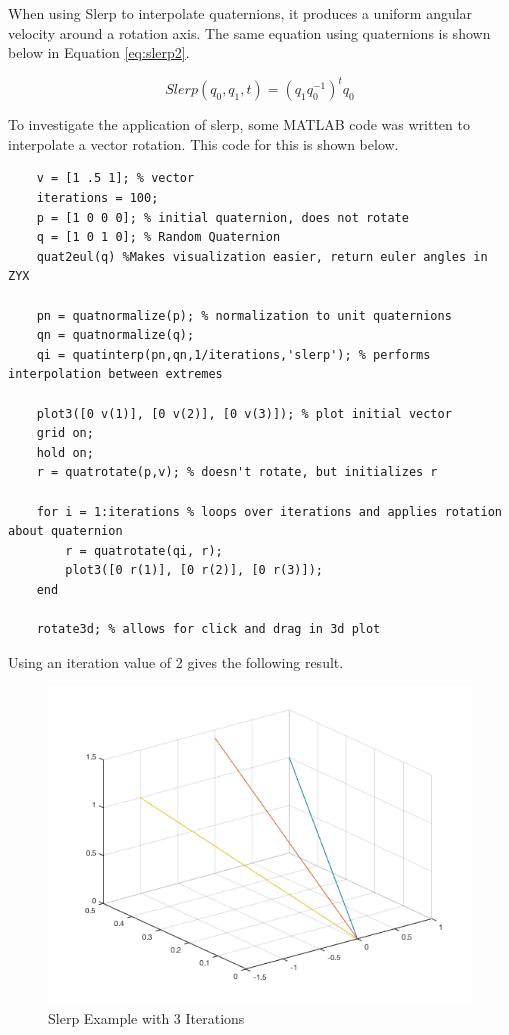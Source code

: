 When using Slerp to interpolate quaternions, it produces a uniform angular velocity around a rotation axis.
The same equation using quaternions is shown below in Equation \ref{eq:slerp2}.

\begin{equation}
	Slerp(q_0, q_1, t) = (q_1q_0^{-1})^tq_0
\label{eq:slerp2}
\end{equation}

To investigate the application of slerp, some MATLAB code was written to interpolate a vector rotation.
This code for this is shown below.

\begin{verbatim}
	v = [1 .5 1]; % vector
	iterations = 100;
	p = [1 0 0 0]; % initial quaternion, does not rotate
	q = [1 0 1 0]; % Random Quaternion
	quat2eul(q) %Makes visualization easier, return euler angles in ZYX

	pn = quatnormalize(p); % normalization to unit quaternions
	qn = quatnormalize(q);
	qi = quatinterp(pn,qn,1/iterations,'slerp'); % performs interpolation between extremes

	plot3([0 v(1)], [0 v(2)], [0 v(3)]); % plot initial vector
	grid on;
	hold on;
	r = quatrotate(p,v); % doesn't rotate, but initializes r

	for i = 1:iterations % loops over iterations and applies rotation about quaternion
	    r = quatrotate(qi, r);
	    plot3([0 r(1)], [0 r(2)], [0 r(3)]);
	end

	rotate3d; % allows for click and drag in 3d plot
\end{verbatim}

Using an iteration value of 2 gives the following result.

\begin{figure}[H]
\centering
\includegraphics[width = .75\textwidth]{Figures/slerp2.png}
\caption{Slerp Example with 3 Iterations}
\label{fig:slerp3}
\end{figure}

